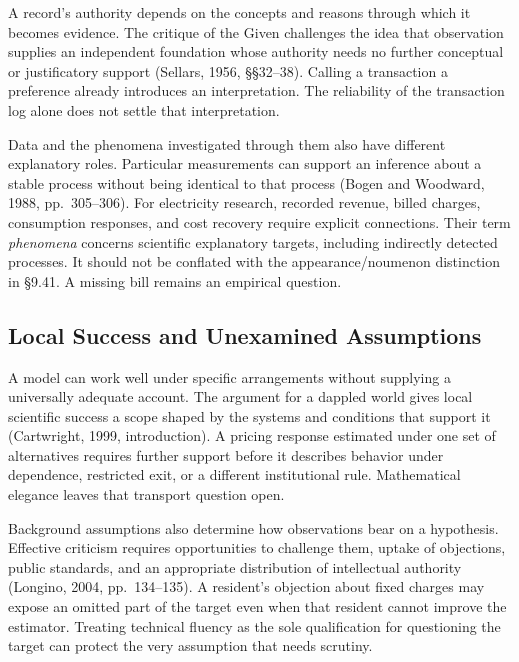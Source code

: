 \noindent \noindent A record's authority depends on the concepts and reasons
through which it becomes evidence. The critique of the Given challenges
the idea that observation supplies an independent foundation whose
authority needs no further conceptual or justificatory support (Sellars,
1956, §§32--38). Calling a transaction a preference already introduces
an interpretation. The reliability of the transaction log alone does not
settle that interpretation.

Data and the phenomena investigated through them also have different
explanatory roles. Particular measurements can support an inference
about a stable process without being identical to that process (Bogen
and Woodward, 1988, pp.~305--306). For electricity research, recorded
revenue, billed charges, consumption responses, and cost recovery
require explicit connections. Their term \emph{phenomena} concerns
scientific explanatory targets, including indirectly detected processes.
It should not be conflated with the appearance/noumenon distinction in
§9.41. A missing bill remains an empirical question.

\hypertarget{M09-local-success-and-unexamined-assumptions}{%
\subsection{Local Success and Unexamined
Assumptions}\label{M09-local-success-and-unexamined-assumptions}}

\noindent \noindent A model can work well under specific arrangements without
supplying a universally adequate account. The argument for a dappled
world gives local scientific success a scope shaped by the systems and
conditions that support it (Cartwright, 1999, introduction). A pricing
response estimated under one set of alternatives requires further
support before it describes behavior under dependence, restricted exit,
or a different institutional rule. Mathematical elegance leaves that
transport question open.

Background assumptions also determine how observations bear on a
hypothesis. Effective criticism requires opportunities to challenge
them, uptake of objections, public standards, and an appropriate
distribution of intellectual authority (Longino, 2004, pp.~134--135). A
resident's objection about fixed charges may expose an omitted part of
the target even when that resident cannot improve the estimator.
Treating technical fluency as the sole qualification for questioning the
target can protect the very assumption that needs scrutiny.


